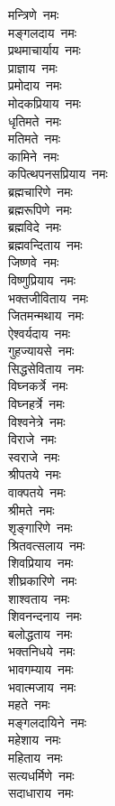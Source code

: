 \begin{multicols}{2}
\begin{flushleft}
मन्त्रिणे~नमः\\
मङ्गलदाय~नमः\\
प्रथमाचार्याय~नमः\\
प्राज्ञाय~नमः\\
प्रमोदाय~नमः\\
मोदकप्रियाय~नमः\\
धृतिमते~नमः\\
मतिमते~नमः\hfill{}\\
कामिने~नमः\\
कपित्थपनसप्रियाय~नमः\\
ब्रह्मचारिणे~नमः\\
ब्रह्मरूपिणे~नमः\\
ब्रह्मविदे~नमः\\
ब्रह्मवन्दिताय~नमः\\
जिष्णवे~नमः\\
विष्णुप्रियाय~नमः\\
भक्तजीविताय~नमः\\
जितमन्मथाय~नमः\hfill{}\\
ऐश्वर्यदाय~नमः\\
गुहज्यायसे~नमः\\
सिद्धसेविताय~नमः\\
विघ्नकर्त्रे~नमः\\
विघ्नहर्त्रे~नमः\\
विश्वनेत्रे~नमः\\
विराजे~नमः\\
स्वराजे~नमः\\
श्रीपतये~नमः\\
वाक्पतये~नमः\hfill{}\\
श्रीमते~नमः\\
शृङ्गारिणे~नमः\\
श्रितवत्सलाय~नमः\\
शिवप्रियाय~नमः\\
शीघ्रकारिणे~नमः\\
शाश्वताय~नमः\\
शिवनन्दनाय~नमः\\
बलोद्धताय~नमः\\
भक्तनिधये~नमः\\
भावगम्याय~नमः\hfill{}\\
भवात्मजाय~नमः\\
महते~नमः\\
मङ्गलदायिने~नमः\\
महेशाय~नमः\\
महिताय~नमः\\
सत्यधर्मिणे~नमः\\
सदाधाराय~नमः\\

\end{flushleft}
\end{multicols}
